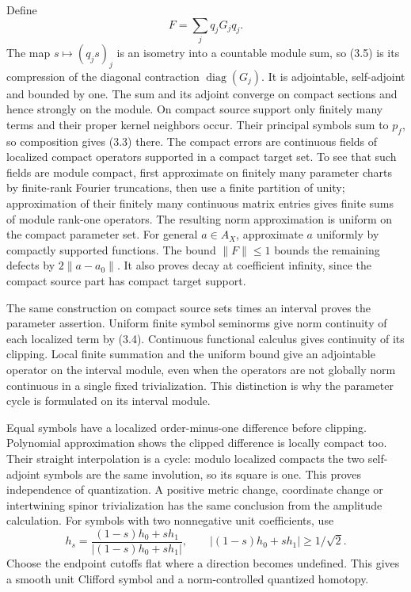 \documentclass[
  11pt,
]{article}
\begin{document}
Define \[
 F=\sum_j q_jG_jq_j.
 \tag{3.5}
\] The map \(s\mapsto(q_js)_j\) is an isometry into a countable module
sum, so (3.5) is its compression of the diagonal contraction
\(\operatorname{diag}(G_j)\). It is adjointable, self-adjoint and
bounded by one. The sum and its adjoint converge on compact sections and
hence strongly on the module. On compact source support only finitely
many terms and their proper kernel neighbors occur. Their principal
symbols sum to \(p_f\), so composition gives (3.3) there. The compact
errors are continuous fields of localized compact operators supported in
a compact target set. To see that such fields are module compact, first
approximate on finitely many parameter charts by finite-rank Fourier
truncations, then use a finite partition of unity; approximation of
their finitely many continuous matrix entries gives finite sums of
module rank-one operators. The resulting norm approximation is uniform
on the compact parameter set. For general \(a\in A_X\), approximate
\(a\) uniformly by compactly supported functions. The bound
\(\|F\|\leq1\) bounds the remaining defects by \(2\|a-a_0\|\). It also
proves decay at coefficient infinity, since the compact source part has
compact target support.

The same construction on compact source sets times an interval proves
the parameter assertion. Uniform finite symbol seminorms give norm
continuity of each localized term by (3.4). Continuous functional
calculus gives continuity of its clipping. Local finite summation and
the uniform bound give an adjointable operator on the interval module,
even when the operators are not globally norm continuous in a single
fixed trivialization. This distinction is why the parameter cycle is
formulated on its interval module.

Equal symbols have a localized order-minus-one difference before
clipping. Polynomial approximation shows the clipped difference is
locally compact too. Their straight interpolation is a cycle: modulo
localized compacts the two self-adjoint symbols are the same involution,
so its square is one. This proves independence of quantization. A
positive metric change, coordinate change or intertwining spinor
trivialization has the same conclusion from the amplitude calculation.
For symbols with two nonnegative unit coefficients, use \[
 h_s=\frac{(1-s)h_0+sh_1}{|(1-s)h_0+sh_1|},
 \qquad |(1-s)h_0+sh_1|\geq1/\sqrt2.
 \tag{3.6}
\] Choose the endpoint cutoffs flat where a direction becomes undefined.
This gives a smooth unit Clifford symbol and a norm-controlled quantized
homotopy.
\end{document}
